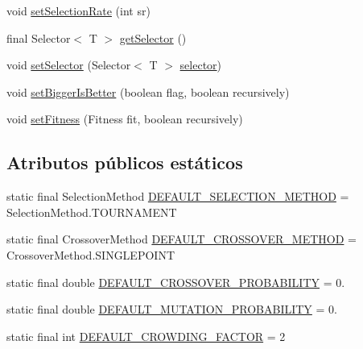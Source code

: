 \begin{DoxyCompactItemize}
void \hyperlink{classjenes_1_1stage_1_1operator_1_1common_1_1_de_jong_crowder_3_01_t_01extends_01_chromosome_01_4_a4d1a71c514bb8ffaeba9a13434dc3635}{set\-Selection\-Rate} (int sr)
\item 
final Selector$<$ T $>$ \hyperlink{classjenes_1_1stage_1_1operator_1_1common_1_1_de_jong_crowder_3_01_t_01extends_01_chromosome_01_4_ac407367e2e9ecad45bab4253ca920a1a}{get\-Selector} ()
\item 
void \hyperlink{classjenes_1_1stage_1_1operator_1_1common_1_1_de_jong_crowder_3_01_t_01extends_01_chromosome_01_4_a880fdcaa7ccc39a3f5512b4bd58e74ad}{set\-Selector} (Selector$<$ T $>$ \hyperlink{classjenes_1_1stage_1_1operator_1_1common_1_1_de_jong_crowder_3_01_t_01extends_01_chromosome_01_4_a6486b0225d345afd81b86dd04772d5ba}{selector})
\item 
void \hyperlink{classjenes_1_1stage_1_1operator_1_1common_1_1_de_jong_crowder_3_01_t_01extends_01_chromosome_01_4_a75bf0d077c6bff093600f1f4c333d3d1}{set\-Bigger\-Is\-Better} (boolean flag, boolean recursively)
\item 
void \hyperlink{classjenes_1_1stage_1_1operator_1_1common_1_1_de_jong_crowder_3_01_t_01extends_01_chromosome_01_4_a856473a5ced464b1923545059c9f2e67}{set\-Fitness} (Fitness fit, boolean recursively)
\end{DoxyCompactItemize}
\subsection*{Atributos públicos estáticos}
\begin{DoxyCompactItemize}
\item 
static final Selection\-Method \hyperlink{classjenes_1_1stage_1_1operator_1_1common_1_1_de_jong_crowder_3_01_t_01extends_01_chromosome_01_4_a21277e6e0728d4e83cc353337bc5f66d}{D\-E\-F\-A\-U\-L\-T\-\_\-\-S\-E\-L\-E\-C\-T\-I\-O\-N\-\_\-\-M\-E\-T\-H\-O\-D} = Selection\-Method.\-T\-O\-U\-R\-N\-A\-M\-E\-N\-T
\item 
static final Crossover\-Method \hyperlink{classjenes_1_1stage_1_1operator_1_1common_1_1_de_jong_crowder_3_01_t_01extends_01_chromosome_01_4_a2798047916292a1449952a7274f9f26d}{D\-E\-F\-A\-U\-L\-T\-\_\-\-C\-R\-O\-S\-S\-O\-V\-E\-R\-\_\-\-M\-E\-T\-H\-O\-D} = Crossover\-Method.\-S\-I\-N\-G\-L\-E\-P\-O\-I\-N\-T
\item 
static final double \hyperlink{classjenes_1_1stage_1_1operator_1_1common_1_1_de_jong_crowder_3_01_t_01extends_01_chromosome_01_4_a522c94dff2a39743f6dfddec03a2ce47}{D\-E\-F\-A\-U\-L\-T\-\_\-\-C\-R\-O\-S\-S\-O\-V\-E\-R\-\_\-\-P\-R\-O\-B\-A\-B\-I\-L\-I\-T\-Y} = 0.
\item 
static final double \hyperlink{classjenes_1_1stage_1_1operator_1_1common_1_1_de_jong_crowder_3_01_t_01extends_01_chromosome_01_4_a19680564524e8d194044526740001c84}{D\-E\-F\-A\-U\-L\-T\-\_\-\-M\-U\-T\-A\-T\-I\-O\-N\-\_\-\-P\-R\-O\-B\-A\-B\-I\-L\-I\-T\-Y} = 0.
\item 
static final int \hyperlink{classjenes_1_1stage_1_1operator_1_1common_1_1_de_jong_crowder_3_01_t_01extends_01_chromosome_01_4_a7e7afe01b26af0cdd28d392ab7866576}{D\-E\-F\-A\-U\-L\-T\-\_\-\-C\-R\-O\-W\-D\-I\-N\-G\-\_\-\-F\-A\-C\-T\-O\-R} = 2
\end{DoxyCompactItemize}
